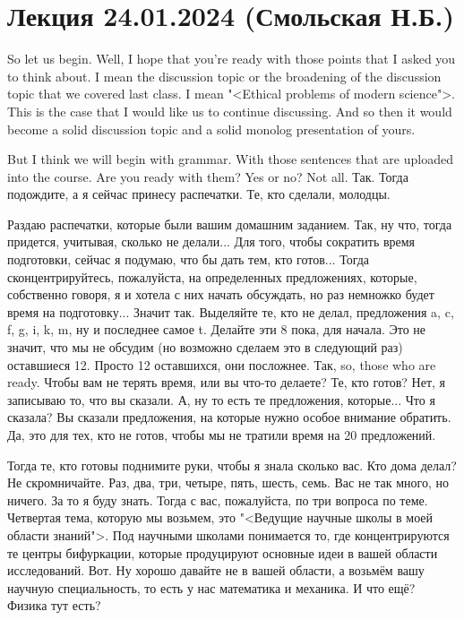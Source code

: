 \documentclass[main.tex]{subfiles}
\begin{document}
\section{Лекция 24.01.2024 (Смольская Н.Б.)}

So let us begin.
Well, I hope that you're ready with those points that I asked you to think about.
I mean the discussion topic or the broadening of the discussion topic that we covered last class.
I mean "<Ethical problems of modern science">.
This is the case that I would like us to continue discussing.
And so then it would become a solid discussion topic and a solid monolog presentation of yours.

But I think we will begin with grammar.
With those sentences that are uploaded into the course.
Are you ready with them?
Yes or no?
Not all.
Так. Тогда подождите, а я сейчас принесу распечатки.
Те, кто сделали, молодцы.

Раздаю распечатки, которые были вашим домашним заданием.
Так, ну что, тогда придется, учитывая, сколько не делали...
Для того, чтобы сократить время подготовки, сейчас я подумаю, что бы дать тем, кто готов...
Тогда сконцентрируйтесь, пожалуйста, на определенных предложениях, которые, собственно говоря, я и хотела с них начать обсуждать, но раз немножко будет время на подготовку...
Значит так.
Выделяйте те, кто не делал, предложения a, c, f, g, i, k, m, ну и последнее самое t.
Делайте эти 8 пока, для начала.
Это не значит, что мы не обсудим (но возможно сделаем это в следующий раз) оставшиеся 12.
Просто 12 оставшихся, они посложнее.
Так, so, those who are ready.
Чтобы вам не терять время, или вы что-то делаете?
Те, кто готов?
Нет, я записываю то, что вы сказали.
А, ну то есть те предложения, которые...
Что я сказала?
Вы сказали предложения, на которые нужно особое внимание обратить.
Да, это для тех, кто не готов, чтобы мы не тратили время на 20 предложений.

Тогда те, кто готовы поднимите руки, чтобы я знала сколько вас.
Кто дома делал?
Не скромничайте.
Раз, два, три, четыре, пять, шесть, семь.
Вас не так много, но ничего.
За то я буду знать.
Тогда с вас, пожалуйста, по три вопроса по теме.
Четвертая тема, которую мы возьмем, это "<Ведущие научные школы в моей области знаний">.
Под научными школами понимается то, где концентрируются те центры бифуркации, которые продуцируют основные идеи в вашей области исследований.
Вот.
Ну хорошо давайте не в вашей области, а возьмём вашу научную специальность, то есть у нас математика и механика.
И что ещё?
Физика тут есть?
\end{document}
